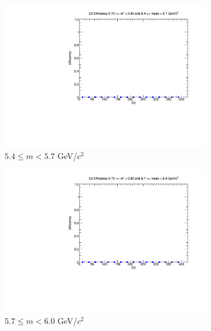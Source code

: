\begin{figure}[p]
\begin{subfigure}[b]{0.32\textwidth}
        \includegraphics[width=\textwidth]{./kTrackerEfficiencyPlots/D2_Efficiency_xF15_mass4.pdf}
        \caption{$5.4 \leq m < 5.7$ GeV/$c^2$}
        \label{fig:xF15_mass4}
    \end{subfigure}
    \hfill
    \begin{subfigure}[b]{0.32\textwidth}
        \centering
        \includegraphics[width=\textwidth]{./kTrackerEfficiencyPlots/D2_Efficiency_xF15_mass5.pdf}
        \caption{$5.7 \leq m < 6.0$ GeV/$c^2$}
        \label{fig:xF15_mass5}
    \end{subfigure}
    \vspace{0.5cm}
    \begin{subfigure}[b]{0.32\textwidth}
        \centering

\end{subfigure}
\end{figure}
